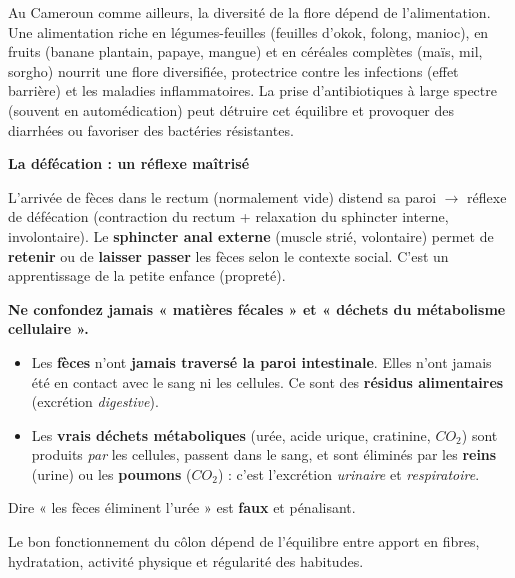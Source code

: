 \documentclass[11pt]{article}
\newcounter{popsec}
\newcounter{popsub}
\newcommand{\courssub}[1]{%
  \stepcounter{popsub}%
  \par\vspace{9pt}\noindent{\popxbold\fontsize{11.5}{13}\selectfont\color{popink}{\color{poporange}\thepopsec.\thepopsub}\hspace{6pt}#1}\par\nopagebreak\vspace{4pt}
}
\begin{document}
\begin{savaistu}
Au Cameroun comme ailleurs, la diversité de la flore dépend de l'alimentation. Une alimentation riche en légumes-feuilles (feuilles d'okok, folong, manioc), en fruits (banane plantain, papaye, mangue) et en céréales complètes (maïs, mil, sorgho) nourrit une flore diversifiée, protectrice contre les infections (effet barrière) et les maladies inflammatoires. La prise d'antibiotiques à large spectre (souvent en automédication) peut détruire cet équilibre et provoquer des diarrhées ou favoriser des bactéries résistantes.
\end{savaistu}

\textbf{La défécation : un réflexe maîtrisé}\par
L'arrivée de fèces dans le rectum (normalement vide) distend sa paroi $\rightarrow$ réflexe de défécation (contraction du rectum + relaxation du sphincter interne, involontaire). Le \textbf{sphincter anal externe} (muscle strié, volontaire) permet de \textbf{retenir} ou de \textbf{laisser passer} les fèces selon le contexte social. C'est un apprentissage de la petite enfance (propreté).

\begin{attention}
\textbf{Ne confondez jamais « matières fécales » et « déchets du métabolisme cellulaire ».}
\begin{itemize}
    \item Les \textbf{fèces} n'ont \textbf{jamais traversé la paroi intestinale}. Elles n'ont jamais été en contact avec le sang ni les cellules. Ce sont des \textbf{résidus alimentaires} (excrétion \emph{digestive}).
    \item Les \textbf{vrais déchets métaboliques} (urée, acide urique, cratinine, $CO_2$) sont produits \emph{par} les cellules, passent dans le sang, et sont éliminés par les \textbf{reins} (urine) ou les \textbf{poumons} ($CO_2$) : c'est l'excrétion \emph{urinaire} et \emph{respiratoire}.
\end{itemize}
Dire « les fèces éliminent l'urée » est \textbf{faux} et pénalisant.
\end{attention}

\courssub{Troubles du transit intestinal}

Le bon fonctionnement du côlon dépend de l'équilibre entre apport en fibres, hydratation, activité physique et régularité des habitudes.
\end{document}
